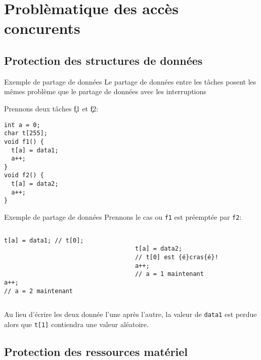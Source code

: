 \section{Problèmatique des accès concurents}

\subsection{Protection des structures de données}

\begin{frame}[fragile]{Exemple de partage de données}
  Le partage de données entre les tâches posent les mêmes problème que
  le partage de données avec les interruptions

  Prennons deux tâches \c{f1} et \c{f2}:
  \begin{lstlisting}
int a = 0;
char t[255];
void f1() {
  t[a] = data1;
  a++;
}
void f2() {
  t[a] = data2;
  a++;
}
       \end{lstlisting}
\end{frame} 

\begin{frame}[fragile]{Exemple de partage de données}
Prennons le cas ou \verb+f1+ est préemptée par \verb+f2+:
  \begin{columns}
    \begin{column}{5cm}
      \begin{lstlisting}[showlines=true,emptylines=10]
t[a] = data1; // t[0];




a++;
// a = 2 maintenant
       \end{lstlisting}
     \end{column}
     \begin{column}{5cm}
      \begin{lstlisting}[showlines=true,emptylines=10,escapeinside=\{\}]

t[a] = data2; 
// t[0] est {é}cras{é}!
a++;
// a = 1 maintenant


       \end{lstlisting}
    \end{column}
  \end{columns}

  Au lieu d'écrire  les deux donnée l'une après  l'autre, la valeur de
  \verb+data1+ est perdue alors  que \verb+t[1]+ contiendra une valeur
  aléatoire.
\end{frame} 

\subsection{Protection des ressources matériel}

